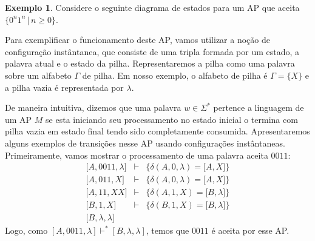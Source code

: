 \documentclass[a4paper]{article}
\theoremstyle{definition}
\newtheorem{Example}{Exemplo}
\begin{document}
  \begin{Example}
    Considere o seguinte diagrama de estados para um AP que aceita
    $\{0^n1^n\,|\,n\geq 0\}$.
    \begin{figure}[H]
      \centering
    \end{figure}
    Para exemplificar o funcionamento deste AP, vamos utilizar a noção de
    configuração instântanea, que consiste de uma tripla formada por um estado,
    a palavra atual e o estado da pilha. Representaremos a pilha como uma
    palavra sobre um alfabeto $\Gamma$ de pilha. Em nosso exemplo, o alfabeto de
    pilha é $\Gamma=\{X\}$ e a pilha vazia é representada por $\lambda$.

    De maneira intuitiva, dizemos que uma palavra $w \in \Sigma^*$ pertence a
    linguagem de um AP $M$ se esta iniciando seu processamento no estado inicial
    o termina com pilha vazia em estado final tendo sido completamente
    consumida. Apresentaremos alguns exemplos de transições nesse AP usando
    configurações instântaneas. Primeiramente, vamos mostrar o processamento de
    uma palavra aceita $0011$:
    \[
      \begin{array}{lcl}
        \lbrack A,0011,\lambda \rbrack & \vdash & \{\delta(A,0,\lambda) =
                                                  \lbrack A, X \rbrack\} \\
        \lbrack A,011, X \rbrack & \vdash & \{\delta(A,0,\lambda) =
                                            \lbrack A, X \rbrack\} \\
        \lbrack A,11, XX \rbrack & \vdash & \{\delta(A,1,X) =
                                            \lbrack B, \lambda \rbrack\} \\
        \lbrack B,1,X \rbrack & \vdash & \{\delta(B,1,X) = \lbrack B, \lambda
                                         \rbrack \} \\
        \lbrack B, \lambda, \lambda \rbrack
      \end{array}
    \]
    Logo, como $[A,0011,\lambda]\vdash^*[B,\lambda,\lambda]$, temos que $0011$ é
    aceita por esse AP.


\end{Example}
\end{document}
